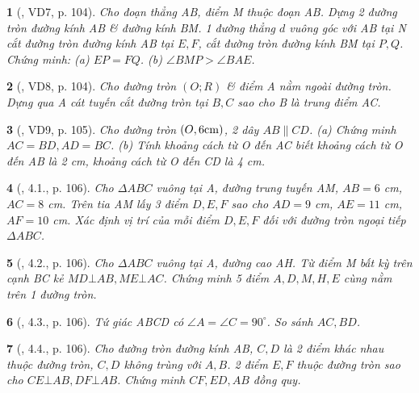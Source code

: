 \documentclass{article}
\newtheorem{baitoan}{}
\begin{document}
\begin{baitoan}[\cite{Binh_boi_duong_Toan_9_tap_1}, VD7, p. 104]
	Cho đoạn thẳng AB, điểm M thuộc đoạn AB. Dựng 2 đường tròn đường kính AB \& đường kính BM. 1 đường thẳng $d$ vuông góc với AB tại N cắt đường tròn đường kính AB tại $E,F$, cắt đường tròn đường kính BM tại $P,Q$. Chứng minh: (a) $EP = FQ$. (b) $\angle{BMP} > \angle{BAE}$.
\end{baitoan}

\begin{baitoan}[\cite{Binh_boi_duong_Toan_9_tap_1}, VD8, p. 104]
	Cho đường tròn $(O;R)$ \& điểm A nằm ngoài đường tròn. Dựng qua A cát tuyến cắt đường tròn tại $B,C$ sao cho B là trung điểm AC.
\end{baitoan}

\begin{baitoan}[\cite{Binh_boi_duong_Toan_9_tap_1}, VD9, p. 105]
	Cho đường tròn $(O,6{\rm cm})$, 2 dây $AB\parallel CD$. (a) Chứng minh $AC = BD,AD = BC$. (b) Tính khoảng cách từ O đến AC biết khoảng cách từ O đến AB là {\rm2 cm}, khoảng cách từ O đến CD là {\rm4 cm}.
\end{baitoan}

\begin{baitoan}[\cite{Binh_boi_duong_Toan_9_tap_1}, 4.1., p. 106]
	Cho $\Delta ABC$ vuông tại A, đường trung tuyến AM, $AB = 6$ {\rm cm}, $AC = 8$ {\rm cm}. Trên tia AM lấy 3 điểm $D,E,F$ sao cho $AD = 9$ {\rm cm}, $AE = 11$ {\rm cm}, $AF = 10$ {\rm cm}. Xác định vị trí của mỗi điểm $D,E,F$ đối với đường tròn ngoại tiếp $\Delta ABC$.
\end{baitoan}

\begin{baitoan}[\cite{Binh_boi_duong_Toan_9_tap_1}, 4.2., p. 106]
	Cho $\Delta ABC$ vuông tại A, đường cao AH. Từ điểm M bất kỳ trên cạnh BC kẻ $MD\bot AB,ME\bot AC$. Chứng minh 5 điểm $A,D,M,H,E$ cùng nằm trên 1 đường tròn.
\end{baitoan}

\begin{baitoan}[\cite{Binh_boi_duong_Toan_9_tap_1}, 4.3., p. 106]
	Tứ giác ABCD có $\angle{A} = \angle{C} = 90^\circ$. So sánh $AC,BD$.
\end{baitoan}

\begin{baitoan}[\cite{Binh_boi_duong_Toan_9_tap_1}, 4.4., p. 106]
	Cho đường tròn đường kính AB, $C,D$ là 2 điểm khác nhau thuộc đường tròn, $C,D$ không trùng với $A,B$. 2 điểm $E,F$ thuộc đường tròn sao cho $CE\bot AB,DF\bot AB$. Chứng minh $CF,ED,AB$ đồng quy.
\end{baitoan}
\end{document}
